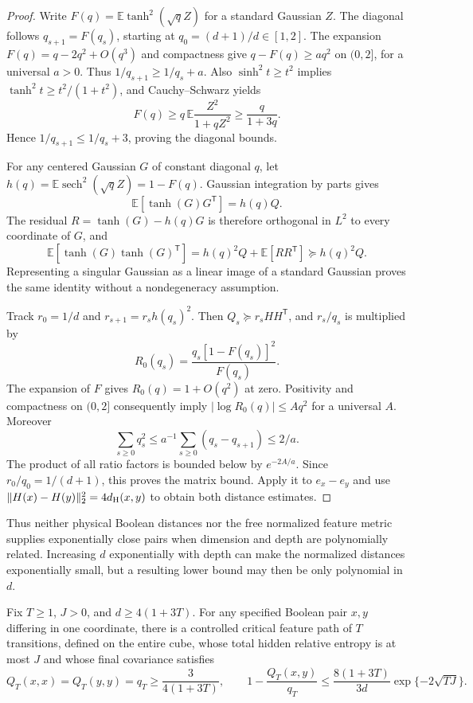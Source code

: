 \begin{proof}
Write $F(q)=\mathbb E\tanh^2(\sqrt qZ)$ for a standard Gaussian $Z$.
The diagonal follows $q_{s+1}=F(q_s)$, starting at
$q_0=(d+1)/d\in[1,2]$. The expansion
$F(q)=q-2q^2+O(q^3)$ and compactness give
$q-F(q)\ge a q^2$ on $(0,2]$, for a universal $a>0$.
Thus $1/q_{s+1}\ge1/q_s+a$.
Also $\sinh^2t\ge t^2$ implies
$\tanh^2t\ge t^2/(1+t^2)$, and Cauchy--Schwarz yields
\[
 F(q)\ge q\,\mathbb E\frac{Z^2}{1+qZ^2}
       \ge\frac q{1+3q}.
\]
Hence $1/q_{s+1}\le1/q_s+3$, proving the diagonal bounds.

For any centered Gaussian $G$ of constant diagonal $q$, let
$h(q)=\mathbb E\operatorname{sech}^2(\sqrt qZ)=1-F(q)$.
Gaussian integration by parts gives
\[
 \mathbb E[\tanh(G)G^{\mathsf T}]=h(q)Q.
\]
The residual $R=\tanh(G)-h(q)G$ is therefore orthogonal in $L^2$
to every coordinate of $G$, and
\[
 \mathbb E[\tanh(G)\tanh(G)^{\mathsf T}]
   =h(q)^2Q+\mathbb E[RR^{\mathsf T}]\succeq h(q)^2Q.
\]
Representing a singular Gaussian as a linear image of a standard
Gaussian proves the same identity without a nondegeneracy assumption.

Track $r_0=1/d$ and $r_{s+1}=r_sh(q_s)^2$. Then
$Q_s\succeq r_sHH^{\mathsf T}$, and $r_s/q_s$ is multiplied by
\[
 R_0(q_s)=\frac{q_s[1-F(q_s)]^2}{F(q_s)}.
\]
The expansion of $F$ gives $R_0(q)=1+O(q^2)$ at zero.
Positivity and compactness on $(0,2]$ consequently imply
$|\log R_0(q)|\le A q^2$ for a universal $A$.
Moreover
\[
 \sum_{s\ge0}q_s^2\le a^{-1}\sum_{s\ge0}(q_s-q_{s+1})\le2/a.
\]
The product of all ratio factors is bounded below by $e^{-2A/a}$.
Since $r_0/q_0=1/(d+1)$, this proves the matrix bound.
Apply it to $e_x-e_y$ and use
$\|H(x)-H(y)\|_2^2=4d_{\rm H}(x,y)$ to obtain both distance
estimates.
\end{proof}

Thus neither physical Boolean distances nor the free normalized feature
metric supplies exponentially close pairs when dimension and depth are
polynomially related. Increasing $d$ exponentially with depth can make
the normalized distances exponentially small, but a resulting lower
bound may then be only polynomial in $d$.

\begin{proposition}
\label{prop:critical-controlled-pair-contraction}
Fix $T\ge1$, $J>0$, and $d\ge4(1+3T)$. For any specified Boolean
pair $x,y$ differing in one coordinate, there is a controlled critical
feature path of $T$ transitions, defined on the entire cube, whose
total hidden relative entropy is at most $J$ and whose final covariance
satisfies
\[
 Q_T(x,x)=Q_T(y,y)=q_T\ge\frac3{4(1+3T)},
 \qquad
 1-\frac{Q_T(x,y)}{q_T}
 \le\frac{8(1+3T)}{3d}\exp\{-2\sqrt{TJ}\}.
\]
\end{proposition}

